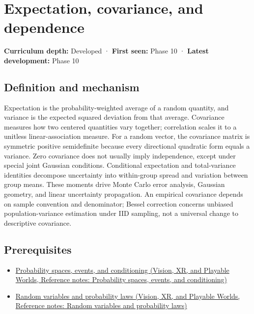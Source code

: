 \hypertarget{appendix-54c383df9992}{}\label{referencestart:appendix-54c383df9992}
\section{Expectation, covariance, and dependence}\label{appendix-54c383df9992-expectation-covariance-and-dependence}

\textbf{Curriculum depth:} Developed · \textbf{First seen:} Phase 10 · \textbf{Latest development:} Phase 10

\begin{allmightroledefinition}

\subsection{Definition and mechanism}\label{appendix-54c383df9992-definition-and-mechanism}

Expectation is the probability-weighted average of a random quantity, and variance is the expected squared deviation from that average. Covariance measures how two centered quantities vary together; correlation scales it to a unitless linear-association measure. For a random vector, the covariance matrix is symmetric positive semidefinite because every directional quadratic form equals a variance. Zero covariance does not usually imply independence, except under special joint Gaussian conditions. Conditional expectation and total-variance identities decompose uncertainty into within-group spread and variation between group means. These moments drive Monte Carlo error analysis, Gaussian geometry, and linear uncertainty propagation. An empirical covariance depends on sample convention and denominator; Bessel correction concerns unbiased population-variance estimation under IID sampling, not a universal change to descriptive covariance.

\end{allmightroledefinition}

\subsection{Prerequisites}\label{appendix-54c383df9992-prerequisites}

\begin{itemize}
\tightlist
\item
  \href{../07-Vision-XR-and-Playable-Worlds/main.pdf\#nameddest=appendix-f1ef323f6ed7}{Probability spaces, events, and conditioning (Vision, XR, and Playable Worlds, Reference notes: Probability spaces, events, and conditioning)}
\item
  \href{../07-Vision-XR-and-Playable-Worlds/main.pdf\#nameddest=appendix-4d0203f7944f}{Random variables and probability laws (Vision, XR, and Playable Worlds, Reference notes: Random variables and probability laws)}
\end{itemize}

